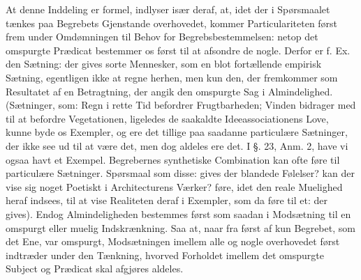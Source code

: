\documentclass[12pt]{book}
\def\textit#1{#1}%
\newcommand{\opage}[1]{\marginnote{\footnotesize\textit{[#1]}}}
\begin{document}
\opage{278} At denne Inddeling er formel, indlyser især deraf, at, idet der i Spørsmaalet tænkes
paa Begrebets Gjenstande overhovedet, kommer Particulariteten først frem under
Omdømningen til Behov for Begrebsbestemmelsen: netop det omspurgte Prædicat bestemmer
os først til at afsondre de nogle. Derfor er f. Ex. den Sætning: der gives sorte
Mennesker, som en blot fortællende empirisk Sætning, egentligen ikke at regne herhen,
men kun den, der fremkommer som Resultatet af en Betragtning, der angik den omspurgte
Sag i Almindelighed. (Sætninger, som: Regn i rette Tid befordrer Frugtbarheden; Vinden
bidrager med til at befordre Vegetationen, ligeledes de saakaldte Ideeassociationens
Love, kunne byde os Exempler, og ere det tillige paa saadanne particulære Sætninger,
der ikke see ud til at være det, men dog aldeles ere det. I §. 23, Anm. 2, have vi
ogsaa havt et Exempel. Begrebernes synthetiske Combination kan ofte føre til
particulære Sætninger. Spørsmaal som disse: gives der blandede Følelser? kan der vise
sig noget Poetiskt i Architecturens Værker? føre, idet den reale Muelighed heraf
indsees, til at vise Realiteten deraf i Exempler, som da føre til et: der gives).
Endog Almindeligheden bestemmes først som saadan i Modsætning til en omspurgt eller
muelig Indskrænkning. Saa at, naar fra først af kun Begrebet, som det Ene, var
omspurgt, Modsætningen imellem alle og nogle overhovedet først
\opage{279} indtræder under den Tænkning, hvorved Forholdet imellem det omspurgte Subject og
Prædicat skal afgjøres aldeles.
\end{document}
